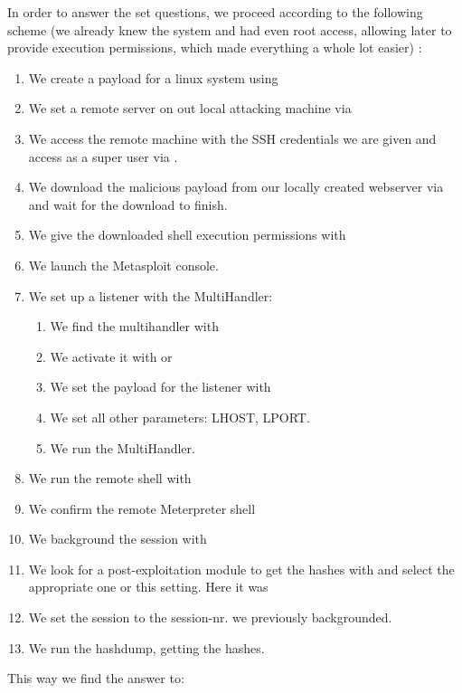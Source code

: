 {In order to answer the set questions, we proceed according to the following scheme (we already knew the system and had even root access, allowing later to provide execution permissions, which made everything a whole lot easier) :
\label{Reverse_Metasploit_Steps} 
\begin{enumerate}
\item We create a payload for a linux system using \\
\item We set a remote server on out local attacking machine via 
\item We access the remote machine with the SSH credentials we are given and access as a super user via .
\item We download the malicious payload from our locally created webserver via 
and wait for the download to finish.
\item We give the downloaded shell execution permissions with 
\item We launch the Metasploit console.
\item We set up a listener with the MultiHandler: 
\begin{enumerate}
\item We find the multihandler with 
\item We activate it with  or 
\item We set the payload for the listener with \\
\item We set all other parameters: LHOST, LPORT. 
\item We run the MultiHandler.
\end{enumerate}
\item We run the remote shell with 
\item We confirm the remote Meterpreter shell
\item We background the session with 
\item We look for a post-exploitation module to get the hashes with  and select the appropriate one or this setting. Here it was 
\item We set the session to the session-nr. we previously backgrounded. 
\item We run the hashdump, getting the hashes.
\end{enumerate}
This way we find the answer to:
}